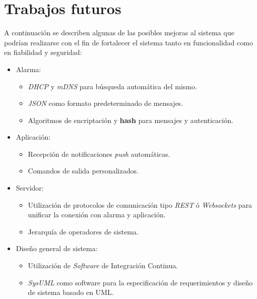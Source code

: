 \newpage

\section{Trabajos futuros}

A continuación se describen algunas de las posibles mejoras al sistema que podrían realizarse con el fin de fortalecer el sistema tanto en funcionalidad como en fiabilidad y seguridad:

\begin{itemize}
\item Alarma:
	\begin{itemize}
	\item \textit{DHCP} y \textit{mDNS} para búsqueda automática del mismo.
	\item \textit{JSON} como formato predeterminado de mensajes.
	\item Algoritmos de encriptación y \textbf{hash} para mensajes y autenticación.
	\end{itemize}
\item Aplicación:
	\begin{itemize}
	\item Recepción de notificaciones \textit{push} automáticas.
	\item Comandos de salida personalizados.
	\end{itemize}
\item Servidor:
	\begin{itemize}
	\item Utilización de protocolos de comunicación tipo \textit{REST} ó \textit{Websockets} para unificar la conexión con alarma y aplicación.
	\item Jerarquía de operadores de sistema.
	\end{itemize}
\item Diseño general de sistema:
	\begin{itemize}
	\item Utilización de \textit{Software} de Integración Continua.
	\item \textit{SysUML} como software para la especificación de requerimientos y diseño de sistema basado en UML.
	\end{itemize}
\end{itemize}

